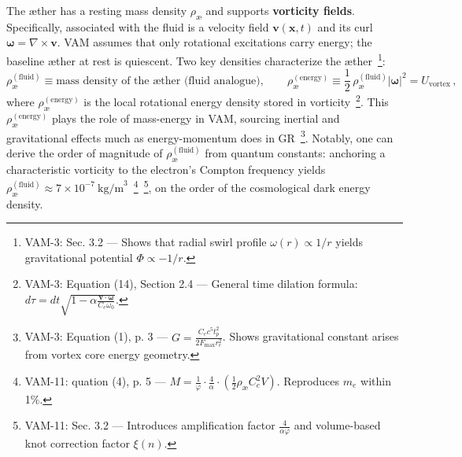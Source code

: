 \documentclass[a4paper,12pt]{article}
\begin{document}
    The æther has a resting mass density $\rho_{\text{\ae}}$ and supports \textbf{vorticity fields}. Specifically, associated with the fluid is a velocity field $\mathbf{v}(\mathbf{x},t)$ and its curl $\boldsymbol{\omega} = \nabla \times \mathbf{v}$. VAM assumes that only rotational excitations carry energy; the baseline æther at rest is quiescent. Two key densities characterize the æther~\footnote{VAM-3: Sec. 3.2 — Shows that radial swirl profile $\omega(r) \propto 1/r$ yields gravitational potential $\Phi \propto -1/r$.}:
    \begin{equation}
        \rho_{\text{\ae}}^{(\text{fluid})} \equiv \text{mass density of the æther (fluid analogue)}, \qquad
        \rho_{\text{\ae}}^{(\text{energy})} \equiv \frac{1}{2}\,\rho_{\text{\ae}}^{(\text{fluid})} |\boldsymbol{\omega}|^2 = U_{\text{vortex}}\,,
        \label{eq:aether-densities}
    \end{equation}
    where $\rho_{\text{\ae}}^{(\text{energy})}$ is the local rotational energy density stored in vorticity~\footnote{VAM-3: Equation (14), Section 2.4 — General time dilation formula: $d\tau = dt \sqrt{1 - \alpha \frac{\mathbf{v} \cdot \boldsymbol{\omega}}{C_e \omega_0}}$.}. This $\rho_{\text{\ae}}^{(\text{energy})}$ plays the role of mass-energy in VAM, sourcing inertial and gravitational effects much as energy-momentum does in GR~\footnote{VAM-3: Equation (1), p. 3 — $G = \frac{C_e c^5 t_p^2}{2 F_{\max} r_c^2}$. Shows gravitational constant arises from vortex core energy geometry.}. Notably, one can derive the order of magnitude of $\rho_{\text{\ae}}^{(\text{fluid})}$ from quantum constants: anchoring a characteristic vorticity to the electron’s Compton frequency yields $\rho_{\text{\ae}}^{(\text{fluid})} \approx 7\times 10^{-7}~\text{kg/m}^3$~\footnote{VAM-11: quation (4), p. 5 — $M = \frac{1}{\varphi} \cdot \frac{4}{\alpha} \cdot \left( \frac{1}{2} \rho_{\text{\ae}} C_e^2 V \right)$. Reproduces $m_e$ within 1\%.}~\footnote{VAM-11: Sec. 3.2 — Introduces amplification factor $\frac{4}{\alpha\varphi}$ and volume-based knot correction factor $\xi(n)$.}, on the order of the cosmological dark energy density.
\end{document}
